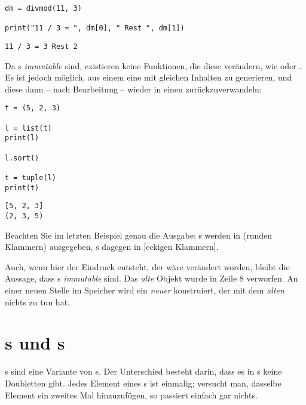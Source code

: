 \begin{codebox}
\begin{verbatim}
dm = divmod(11, 3)

print("11 / 3 = ", dm[0], " Rest ", dm[1])
\end{verbatim}
\end{codebox}

\begin{cmdbox}[Ausgabe]
\begin{verbatim}
11 / 3 = 3 Rest 2
\end{verbatim}
\end{cmdbox}

Da s \emph{immutable} sind, existieren keine Funktionen, die diese verändern, wie \eg {} oder . Es ist jedoch möglich, aus einem  eine  mit gleichen Inhalten zu generieren, und diese dann -- nach Bearbeitung -- wieder in einen  zurückzuverwandeln:

\begin{codebox}
\begin{verbatim}
t = (5, 2, 3)

l = list(t)
print(l)

l.sort()

t = tuple(l)
print(t)
\end{verbatim}
\end{codebox}

\begin{cmdbox}[Ausgabe]
\begin{verbatim}
[5, 2, 3]
(2, 3, 5)
\end{verbatim}
\end{cmdbox}

\begin{hintbox}
Beachten Sie im letzten Beispiel genau die Ausgabe: s werden in (runden Klammern) ausgegeben, s dagegen in [eckigen Klammern].
\end{hintbox}

Auch, wenn hier der Eindruck entsteht, der  wäre verändert worden, bleibt die Aussage, dass s \emph{immutable} sind. Das \emph{alte} Objekt  wurde in Zeile 8 verworfen. An einer neuen Stelle im Speicher wird ein \emph{neuer}  konstruiert, der mit dem \emph{alten}  nichts zu tun hat.

\section{s und s}
s sind eine Variante von s. Der Unterschied besteht darin, dass es in s keine Doubletten gibt. Jedes Element eines s ist einmalig; versucht man, dasselbe Element ein zweites Mal hinzuzufügen, so passiert einfach gar nichts.

